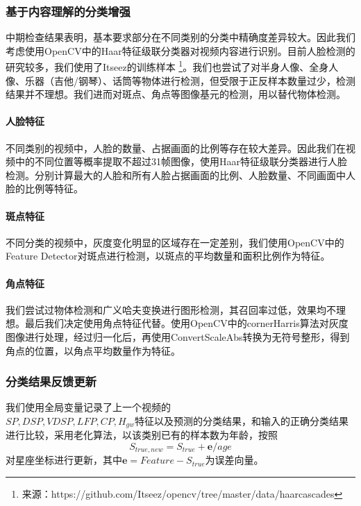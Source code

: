 \documentclass{article}
\begin{document}
\begin{multicols}{2}
            \subsubsection{基于内容理解的分类增强}
                中期检查结果表明，基本要求部分在不同类别的分类中精确度差异较大。因此我们考虑使用OpenCV中的Haar特征级联分类器对视频内容进行识别。目前人脸检测的研究较多，我们使用了Itseez的训练样本
                \footnote{来源：https://github.com/Itseez/opencv/tree/master/data/haarcascades}。我们也尝试了对半身人像、全身人像、乐器（吉他/钢琴）、话筒等物体进行检测，但受限于正反样本数量过少，检测结果并不理想。我们进而对斑点、角点等图像基元的检测，用以替代物体检测。

                \paragraph{人脸特征}
                不同类别的视频中，人脸的数量、占据画面的比例等存在较大差异。因此我们在视频中的不同位置等概率提取不超过31帧图像，使用Haar特征级联分类器进行人脸检测。分别计算最大的人脸和所有人脸占据画面的比例、人脸数量、不同画面中人脸的比例等特征。

                \paragraph{斑点特征}
                不同分类的视频中，灰度变化明显的区域存在一定差别，我们使用OpenCV中的Feature Detector对斑点进行检测，以斑点的平均数量和面积比例作为特征。

                \paragraph{角点特征}
                我们尝试过物体检测和广义哈夫变换进行图形检测，其召回率过低，效果均不理想。最后我们决定使用角点特征代替。使用OpenCV中的cornerHarris算法对灰度图像进行处理，经过归一化后，再使用ConvertScaleAbs转换为无符号整形，得到角点的位置，以角点平均数量作为特征。

            \subsubsection{分类结果反馈更新}
                我们使用全局变量记录了上一个视频的\\$SP, DSP, VDSP, LFP, CP, H_{gw}$特征以及预测的分类结果，和输入的正确分类结果进行比较，采用老化算法，以该类别已有的样本数为年龄，按照
                $$S_{true,new}=S_{true}+\mathbf{e}/age$$
                对星座坐标进行更新，其中$\mathbf{e}=Feature-S_{true}$为误差向量。


\end{multicols}
\end{document}
